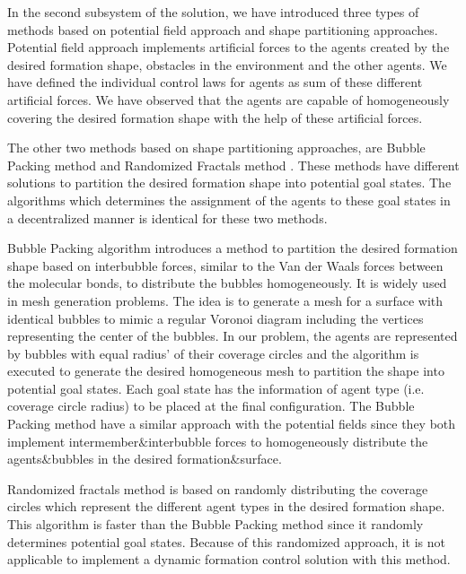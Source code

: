 In the second subsystem of the solution, we have introduced three types of methods based on potential field approach and shape partitioning approaches. Potential field approach implements artificial forces to the agents created by the desired formation shape, obstacles in the environment and the other agents. We have defined the individual control laws for agents as sum of these different artificial forces. We have observed that the agents are capable of homogeneously covering the desired formation shape with the help of these artificial forces.

The other two methods based on shape partitioning approaches, are Bubble Packing method and Randomized Fractals method . These methods have different solutions to partition the desired formation shape into potential goal states. The algorithms which determines the assignment of the agents to these goal states in a decentralized manner is identical for these two methods. 

Bubble Packing algorithm introduces a method to partition the desired formation shape based on interbubble forces, similar to the Van der Waals forces between the molecular bonds, to distribute the bubbles homogeneously. It is widely used in mesh generation problems. The idea is to generate a mesh for a surface with identical bubbles to mimic a regular Voronoi diagram including the vertices representing the center of the bubbles. In our problem, the agents are represented by bubbles with equal radius' of their coverage circles and the algorithm is executed to generate the desired homogeneous mesh to partition the shape into potential goal states. Each goal state has the information of agent type (i.e. coverage circle radius) to be placed at the final configuration. The Bubble Packing method have a similar approach with the potential fields since they both implement intermember$\&$interbubble forces to homogeneously distribute the agents$\&$bubbles in the desired formation$\&$surface.
       
Randomized fractals method is based on randomly distributing the coverage circles which represent the different agent types in the desired formation shape. This algorithm is faster than the Bubble Packing method since it randomly determines potential goal states. Because of this randomized approach, it is not applicable to implement a dynamic formation control solution with this method. 
       
